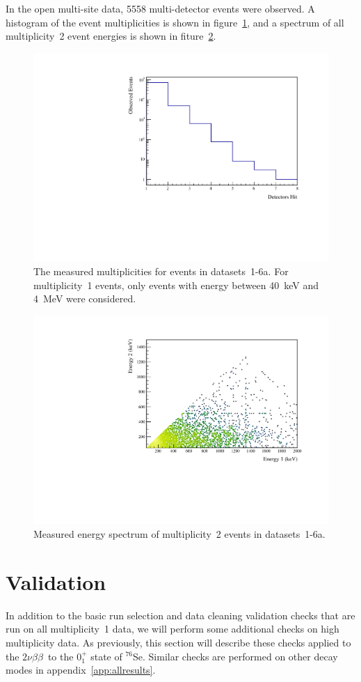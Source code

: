 \documentclass[notitlepage,rmp,aps,10pt]{revtex4-1}
\newcommand{\tnbb}{${2 \nu \beta \beta}$}
\newcommand{\iso}[2]{$^{#1}$#2}
\newcommand{\Se}[1]{\iso{#1}{Se}}
\newcommand{\SP}[3]{$#1^{#2}_{#3}$}
\begin{document}
In the open multi-site data, 5558 multi-detector events were observed.
A histogram of the event multiplicities is shown in figure~\ref{fig:datamult}, and a spectrum of all multiplicity~2 event energies is shown in fiture~\ref{fig:data2D}.
\begin{figure}[h]
  \centering
  \includegraphics[width=.6\linewidth]{DataMultiplicity}
  \caption[Measured event multiplicities]{\label{fig:datamult}
    The measured multiplicities for events in datasets~1-6a. For multiplicity~1 events, only events with energy between 40~keV and 4~MeV were considered.
  }
\end{figure}
\begin{figure}[h]
  \centering
  \includegraphics[width=.8\linewidth]{Data2D}
  \caption[Measured energy spectrum of multiplicity~2 events]{\label{fig:data2D}
    Measured energy spectrum of multiplicity~2 events in datasets~1-6a.
  }
\end{figure}

\section{Validation}
In addition to the basic run selection and data cleaning validation checks that are run on all multiplicity~1 data, we will perform some additional checks on high multiplicity data.
As previously, this section will describe these checks applied to the \tnbb\ to the \SP{0}{+}{1} state of \Se{76}.
Similar checks are performed on other decay modes in appendix~\ref{app:allresults}.
\end{document}
